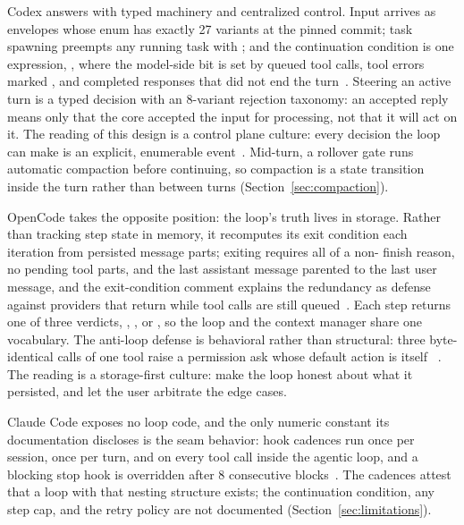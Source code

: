\documentclass{article}
\newcommand{\codex}[0]{Codex}
\newcommand{\occ}[0]{OpenCode}
\newcommand{\ccc}[0]{Claude Code}
\begin{document}
\codex{} answers with typed machinery and centralized control. Input
arrives as  envelopes whose  enum has exactly 27
variants at the pinned commit; task spawning preempts any running task
with ; and the continuation condition is
one expression, , where the model-side bit is set by queued tool calls,
tool errors marked , and completed responses that did
not end the turn~\citep{codexRepo}. Steering an active turn is a typed
decision with an 8-variant rejection taxonomy: an accepted reply means
only that the core accepted the input for processing, not that it will
act on it. The reading of this design is a control plane culture: every
decision the loop can make is an explicit, enumerable
event~\citep{codexRepo}. Mid-turn, a rollover gate runs automatic
compaction before continuing, so compaction is a state transition inside
the turn rather than between turns (Section~\ref{sec:compaction}).

\occ{} takes the opposite position: the loop's truth lives in storage.
Rather than tracking step state in memory, it recomputes its exit
condition each iteration from persisted message parts; exiting requires
all of a non- finish reason, no pending tool parts, and
the last assistant message parented to the last user message, and the
exit-condition comment explains the redundancy as defense against
providers that return  while tool calls are still
queued~\citep{opencodeRepo}. Each step returns one of three
verdicts, , , or , so the loop
and the context manager share one vocabulary. The anti-loop defense is
behavioral rather than structural: three byte-identical calls of one tool
raise a  permission ask whose default action is itself
~\citep{opencodeRepo}. The reading is a storage-first culture:
make the loop honest about what it persisted, and let the user arbitrate
the edge cases.

\ccc{} exposes no loop code, and the only numeric constant its
documentation discloses is the seam behavior: hook cadences run once per
session, once per turn, and on every tool call inside the agentic loop,
and a blocking stop hook is overridden after 8 consecutive
blocks~\citep{claudeCodeDocsHooks}. The cadences attest that a loop with
that nesting structure exists; the continuation condition, any step cap,
and the retry policy are not documented
(Section~\ref{sec:limitations}).
\end{document}
